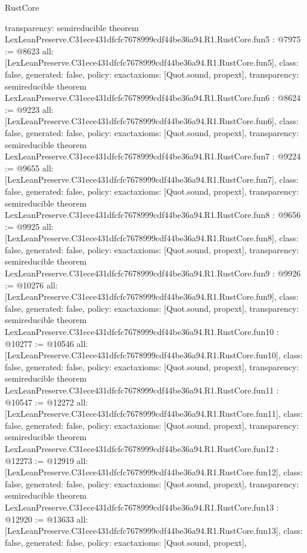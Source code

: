 \begin{lexlean}{RustCore}
\begin{coremodule}
{  transparency: semireducible
}
theorem LexLeanPreserve.C31ece431dfcfc7678999cdf44be36a94.R1.RustCore.fun5 : @7975 := @8623 {
  all: [LexLeanPreserve.C31ece431dfcfc7678999cdf44be36a94.R1.RustCore.fun5],
  class: false,
  generated: false,
  policy: exact{axioms: [Quot.sound, propext]},
  transparency: semireducible
}
theorem LexLeanPreserve.C31ece431dfcfc7678999cdf44be36a94.R1.RustCore.fun6 : @8624 := @9223 {
  all: [LexLeanPreserve.C31ece431dfcfc7678999cdf44be36a94.R1.RustCore.fun6],
  class: false,
  generated: false,
  policy: exact{axioms: [Quot.sound, propext]},
  transparency: semireducible
}
theorem LexLeanPreserve.C31ece431dfcfc7678999cdf44be36a94.R1.RustCore.fun7 : @9224 := @9655 {
  all: [LexLeanPreserve.C31ece431dfcfc7678999cdf44be36a94.R1.RustCore.fun7],
  class: false,
  generated: false,
  policy: exact{axioms: [Quot.sound, propext]},
  transparency: semireducible
}
theorem LexLeanPreserve.C31ece431dfcfc7678999cdf44be36a94.R1.RustCore.fun8 : @9656 := @9925 {
  all: [LexLeanPreserve.C31ece431dfcfc7678999cdf44be36a94.R1.RustCore.fun8],
  class: false,
  generated: false,
  policy: exact{axioms: [Quot.sound, propext]},
  transparency: semireducible
}
theorem LexLeanPreserve.C31ece431dfcfc7678999cdf44be36a94.R1.RustCore.fun9 : @9926 := @10276 {
  all: [LexLeanPreserve.C31ece431dfcfc7678999cdf44be36a94.R1.RustCore.fun9],
  class: false,
  generated: false,
  policy: exact{axioms: [Quot.sound, propext]},
  transparency: semireducible
}
theorem LexLeanPreserve.C31ece431dfcfc7678999cdf44be36a94.R1.RustCore.fun10 : @10277 := @10546 {
  all: [LexLeanPreserve.C31ece431dfcfc7678999cdf44be36a94.R1.RustCore.fun10],
  class: false,
  generated: false,
  policy: exact{axioms: [Quot.sound, propext]},
  transparency: semireducible
}
theorem LexLeanPreserve.C31ece431dfcfc7678999cdf44be36a94.R1.RustCore.fun11 : @10547 := @12272 {
  all: [LexLeanPreserve.C31ece431dfcfc7678999cdf44be36a94.R1.RustCore.fun11],
  class: false,
  generated: false,
  policy: exact{axioms: [Quot.sound, propext]},
  transparency: semireducible
}
theorem LexLeanPreserve.C31ece431dfcfc7678999cdf44be36a94.R1.RustCore.fun12 : @12273 := @12919 {
  all: [LexLeanPreserve.C31ece431dfcfc7678999cdf44be36a94.R1.RustCore.fun12],
  class: false,
  generated: false,
  policy: exact{axioms: [Quot.sound, propext]},
  transparency: semireducible
}
theorem LexLeanPreserve.C31ece431dfcfc7678999cdf44be36a94.R1.RustCore.fun13 : @12920 := @13633 {
  all: [LexLeanPreserve.C31ece431dfcfc7678999cdf44be36a94.R1.RustCore.fun13],
  class: false,
  generated: false,
  policy: exact{axioms: [Quot.sound, propext]},
}
\end{coremodule}
\end{lexlean}
